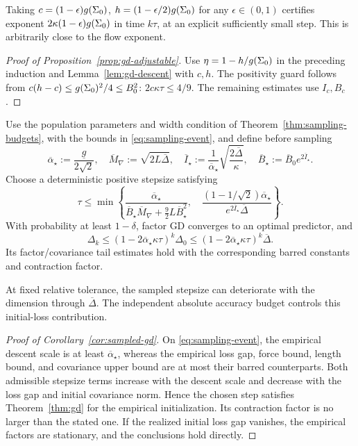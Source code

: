 Taking $c=(1-\epsilon)g(\Sigma_0)$, $h=(1-\epsilon/2)g(\Sigma_0)$ for any
$\epsilon\in(0,1)$ certifies exponent $2\kappa(1-\epsilon)g(\Sigma_0)$ in time
$k\tau$, at an explicit sufficiently small step. This is arbitrarily
close to the flow exponent.

\begin{proof}[Proof of Proposition~\ref{prop:gd-adjustable}]
Use $\eta=1-h/g(\Sigma_0)$ in the preceding induction and
Lemma~\ref{lem:gd-descent} with $c,h$. The positivity guard follows from
$c(h-c)\le g(\Sigma_0)^2/4\le B_0^2$: $2c\kappa\tau\le4/9$.
The remaining estimates use $I_c,B_c$.
\end{proof}
\begin{corollary}\label{cor:sampled-gd}
Use the population parameters and width condition of
Theorem~\ref{thm:sampling-budgets}, with the bounds in
\eqref{eq:sampling-event}, and define before sampling
\[
 \overline\alpha_\star:=\frac{\underline g}{2\sqrt2},\quad
 \overline M_{\nabla}:=\sqrt{2L\overline\Delta},\quad
 \overline I_\star:=\frac1{\overline\alpha_\star}
                    \sqrt{\frac{2\overline\Delta}{\kappa}},\quad
 \overline B_\star:=\overline B_0e^{2\overline I_\star}.
\]
Choose a deterministic positive stepsize satisfying
\begin{equation}\label{eq:sampled-gd-step}
 \tau\le\min\left\{
 \frac{\overline\alpha_\star}
 {\overline B_\star\overline M_{\nabla}+\frac92L\overline B_\star^2},\quad
 \frac{(1-1/\sqrt2)\overline\alpha_\star}
 {e^{2\overline I_\star}\overline\Delta}\right\}.
\end{equation}
With probability at least $1-\delta$, factor GD converges to an optimal
predictor, and
\[
 \Delta_k
 \le(1-2\overline\alpha_\star\kappa\tau)^k\Delta_0
 \le(1-2\overline\alpha_\star\kappa\tau)^k\overline\Delta.
\]
Its factor/covariance tail estimates hold with the corresponding barred
constants and contraction factor.
\end{corollary}

At fixed relative tolerance, the sampled stepsize can deteriorate with
the dimension through $\overline\Delta$. The independent absolute
accuracy budget controls this initial-loss contribution.


\begin{proof}[Proof of Corollary~\ref{cor:sampled-gd}]
On \eqref{eq:sampling-event}, the empirical descent scale is at least
$\overline\alpha_\star$, whereas the empirical loss gap, force bound, length
bound, and covariance upper bound are at most their barred counterparts.
Both admissible stepsize terms increase with the descent scale and
decrease with the loss gap and initial covariance norm. Hence the chosen
step satisfies Theorem~\ref{thm:gd} for the empirical initialization.
Its contraction factor is no larger than the stated one. If the realized
initial loss gap vanishes, the empirical factors are stationary, and the
conclusions hold directly.
\end{proof}

